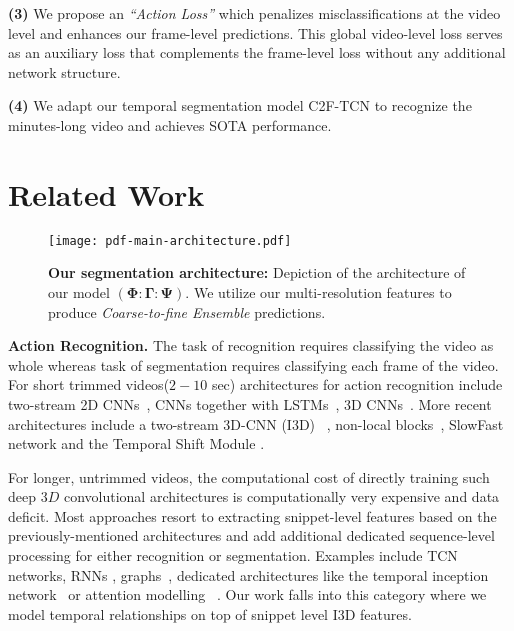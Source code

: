 \documentclass[10pt,twocolumn,letterpaper]{article}
\newcommand{\enc}{\ensuremath{\mathbf{\Phi}}}
\newcommand{\dec}{\ensuremath{\mathbf{\Psi}}}
\newcommand{\bottle}{\ensuremath{\mathbf{\Gamma}}}
\newcommand{\modelname}{C2F-TCN}
\begin{document}
    \textbf{(3)} We propose an \emph{``Action Loss''} which penalizes misclassifications at the video level and enhances our frame-level predictions. This global video-level loss serves as an auxiliary loss that complements the frame-level loss without any additional network structure.
    
    \textbf{(4)} We adapt our temporal segmentation model \modelname{} to recognize the minutes-long video and achieves SOTA performance.
    
\section{Related Work}
\begin{figure*}
\begin{center}
\texttt{[image: pdf-main-architecture.pdf]}
\end{center}
\caption{\textbf{Our segmentation architecture:} Depiction of the architecture of our model $(\enc:\bottle:\dec)$. We utilize our multi-resolution features to produce \textit{Coarse-to-fine Ensemble} predictions.}

\label{fig:main_architecture}
\end{figure*}
\textbf{Action Recognition.} The task of recognition requires classifying the video as whole whereas task of segmentation requires classifying each frame of the video. For short trimmed videos($2-10$ sec) architectures for action recognition include two-stream 2D CNNs~\cite{trimmed2d-feichtenhofer2016convolutional, trimmed2d-simonyan2014two}, CNNs together with LSTMs~\cite{trimmed2dlstm-donahue2015long, trimmed2dlstm-ullah2017action}, 3D CNNs~\cite{trimmed3d-ji20123d, trimmed3d-tran2015learning}.  More recent architectures include a two-stream 3D-CNN (I3D)~\cite{carreira2017quo}
, non-local blocks~\cite{trimmednon-wang2018non}, SlowFast network \cite{longvideosrecog-feichtenhofer2019slowfast} and the Temporal Shift Module \cite{lin2019tsm}.

For longer, untrimmed videos, the computational cost of directly training such deep $3D$ convolutional architectures is computationally very expensive and data deficit. Most approaches resort to extracting snippet-level features based on the previously-mentioned architectures and add additional dedicated sequence-level processing for either recognition or segmentation.
Examples include TCN networks\cite{TED-ding2018weakly, TED-lea2017temporal, TEDresi-lei2018temporal, li2020ms, farha2019ms}, RNNs \cite{prevsegmentrnn-kuehne2018hybrid, prevsegmentrnn-singh2016multi, prevsegmentrnn-perrett2017recurrent}, graphs~\cite{highlevel-hussein2019videograph}, dedicated architectures like the temporal inception network~\cite{highlevel-hussein2019timeception} or attention modelling ~\cite{highlevel-hussein2020pic, sener2020temporal}. Our work falls into this category where we model temporal relationships on top of snippet level I3D features. 
\end{document}
